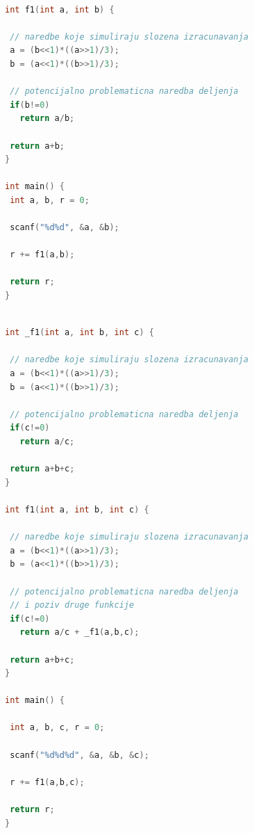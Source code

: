 \documentclass[12pt,oneside]{memoir}
\begin{document}
\begin{lstlisting}[language=C,frame=single,caption=Пример програма прве категорије (друга верзија),label=primer_nivo_1t]

int f1(int a, int b) {

 // naredbe koje simuliraju slozena izracunavanja
 a = (b<<1)*((a>>1)/3);
 b = (a<<1)*((b>>1)/3);
 
 // potencijalno problematicna naredba deljenja
 if(b!=0)
   return a/b;
 
 return a+b;
}

int main() {
 int a, b, r = 0;
 
 scanf("%d%d", &a, &b);
 
 r += f1(a,b);

 return r;
}

\end{lstlisting}

\begin{lstlisting}[language=C,frame=single,caption=Пример програма друге категорије (прва верзија),label=primer_nivo_2]

int _f1(int a, int b, int c) {

 // naredbe koje simuliraju slozena izracunavanja
 a = (b<<1)*((a>>1)/3);
 b = (a<<1)*((b>>1)/3);

 // potencijalno problematicna naredba deljenja 
 if(c!=0)
   return a/c;

 return a+b+c;
}

int f1(int a, int b, int c) {

 // naredbe koje simuliraju slozena izracunavanja
 a = (b<<1)*((a>>1)/3);
 b = (a<<1)*((b>>1)/3);

 // potencijalno problematicna naredba deljenja
 // i poziv druge funkcije 
 if(c!=0)
   return a/c + _f1(a,b,c);

 return a+b+c;
}

int main() {

 int a, b, c, r = 0;

 scanf("%d%d%d", &a, &b, &c);

 r += f1(a,b,c);

 return r;
}


\end{lstlisting}
\end{document}
